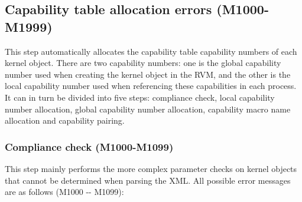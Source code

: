 \subsection{Capability table allocation errors (M1000-M1999)}\label{subsec:5-6-5}

This step automatically allocates the capability table capability numbers of each kernel object. There are two capability numbers: one is the global capability number used when creating the kernel object in the RVM, and the other is the local capability number used when referencing these capabilities in each process. It can in turn be divided into five steps: compliance check, local capability number allocation, global capability number allocation, capability macro name allocation and capability pairing.

\subsubsection{Compliance check (M1000-M1099)}\label{subsubsec:5-6-5-1}

This step mainly performs the more complex parameter checks on kernel objects that cannot be determined when parsing the XML. All possible error messages are as follows (M1000
-\/- M1099):

